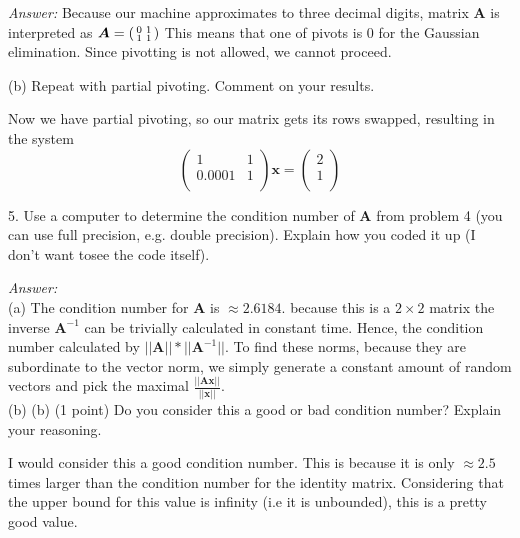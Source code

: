 \documentclass{article}
\begin{document}
    \vspace{0.5cm}
    \textit{Answer:} Because our machine approximates to three decimal digits, matrix $\bm{A}$
    is interpreted as $\bm{A} = \begin{psmallmatrix}
        0 & 1 \\
        1 & 1 \\
    \end{psmallmatrix}$
    This means that one of pivots is 0 for the Gaussian elimination. Since pivotting is not
    allowed, we cannot proceed.

    \vspace{0.5cm}
    (b) Repeat with partial pivoting. Comment on your results.

    \vspace{0.5cm}
    Now we have partial pivoting, so our matrix gets its rows swapped, resulting in
    the system $$\begin{pmatrix}
        1 & 1 \\
        0.0001 & 1 \\
    \end{pmatrix} \bm{x} = \begin{pmatrix}
        2 \\ 1 \\
    \end{pmatrix}$$

    \vspace{1cm}
    5. Use a computer to determine the condition number of $\bm{A}$ from problem 4 
    (you can use full precision, e.g. double precision).  Explain how you coded it up 
    (I don’t want tosee the code itself).
    
    \vspace{0.5cm}
    \textit{Answer:} \\
    (a) The condition number for $\bm{A}$ is $\approx 2.6184$.
    because this is a $2\times 2$ matrix the inverse $\bm{A}^{-1}$ can be trivially
    calculated in constant time. Hence, the condition number calculated by
    $||\bm{A}||*||\bm{A}^{-1}||$. To find these norms, because they are subordinate
    to the vector norm, we simply generate a constant amount of random vectors and 
    pick the maximal $\frac{||\bm{A}\bm{x}||}{||\bm{x}||}$. \\
    (b) (b) (1 point) Do you consider this a good or bad condition number?
    Explain your reasoning.

    \vspace{0.5cm}
    I would consider this a good condition number. This is because it is only $\approx 2.5$
    times larger than the condition number for the identity matrix. Considering that the
    upper bound for this value is infinity (i.e it is unbounded), this is a pretty good value.
\end{document}
